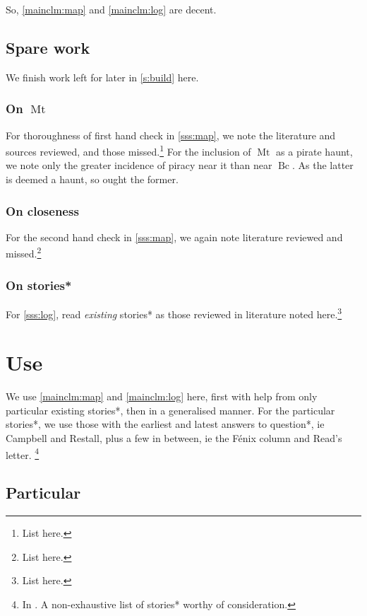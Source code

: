 \documentclass{amsart}
\newcommand{\mention}[1]{\textit{#1}}%
\DeclareMathOperator{\mt}{Mt}%
\DeclareMathOperator{\bc}{Bc}%
\theoremstyle{definition}
\theoremstyle{remark}
\begin{document}
		So, \ref{mainclm:map} and \ref{mainclm:log} are decent.
	\subsection{Spare work}
		\label{ss:sparework}
		We finish work left for later in \ref{s:build} here.
		\subsubsection{On \(\mt\)}
		\label{sss:onmt}
		For thoroughness of first hand check in \ref{sss:map}, we note the literature and sources reviewed, and those missed.\footnote{List here.} For the inclusion of \(\mt\) as a pirate haunt, we note only the greater incidence of piracy near it than near \(\bc\). As the latter is deemed a haunt, so ought the former.
		\subsubsection{On closeness}
		\label{sss:oncloseness}
		For the second hand check in \ref{sss:map}, we again note literature reviewed and missed.\footnote{List here.}
		\subsubsection{On stories*}
		\label{sss:onstories}
		For \ref{sss:log}, read \mention{existing} stories* as those reviewed in literature noted here.\footnote{List here.}
%
%
%
%
\section{Use}
	\label{s:use}
	We use \ref{mainclm:map} and \ref{mainclm:log} here, first with help from only particular existing stories*, then in a generalised manner. For the particular stories*, we use those with the earliest and latest answers to question*, ie Campbell and Restall, plus a few in between, ie the Fénix column and Read's letter. \footnote{In . A non-exhaustive list of stories* worthy of consideration.}
	\subsection{Particular}
		\label{ss:particular}
\end{document}

